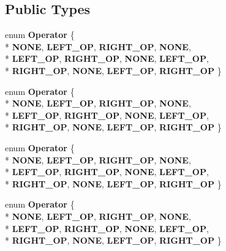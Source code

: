 \subsection*{Public Types}
\begin{DoxyCompactItemize}
\item 
enum {\bfseries Operator} \{ \\*
{\bfseries N\-O\-N\-E}, 
{\bfseries L\-E\-F\-T\-\_\-\-O\-P}, 
{\bfseries R\-I\-G\-H\-T\-\_\-\-O\-P}, 
{\bfseries N\-O\-N\-E}, 
\\*
{\bfseries L\-E\-F\-T\-\_\-\-O\-P}, 
{\bfseries R\-I\-G\-H\-T\-\_\-\-O\-P}, 
{\bfseries N\-O\-N\-E}, 
{\bfseries L\-E\-F\-T\-\_\-\-O\-P}, 
\\*
{\bfseries R\-I\-G\-H\-T\-\_\-\-O\-P}, 
{\bfseries N\-O\-N\-E}, 
{\bfseries L\-E\-F\-T\-\_\-\-O\-P}, 
{\bfseries R\-I\-G\-H\-T\-\_\-\-O\-P}
 \}
\item 
enum {\bfseries Operator} \{ \\*
{\bfseries N\-O\-N\-E}, 
{\bfseries L\-E\-F\-T\-\_\-\-O\-P}, 
{\bfseries R\-I\-G\-H\-T\-\_\-\-O\-P}, 
{\bfseries N\-O\-N\-E}, 
\\*
{\bfseries L\-E\-F\-T\-\_\-\-O\-P}, 
{\bfseries R\-I\-G\-H\-T\-\_\-\-O\-P}, 
{\bfseries N\-O\-N\-E}, 
{\bfseries L\-E\-F\-T\-\_\-\-O\-P}, 
\\*
{\bfseries R\-I\-G\-H\-T\-\_\-\-O\-P}, 
{\bfseries N\-O\-N\-E}, 
{\bfseries L\-E\-F\-T\-\_\-\-O\-P}, 
{\bfseries R\-I\-G\-H\-T\-\_\-\-O\-P}
 \}
\item 
enum {\bfseries Operator} \{ \\*
{\bfseries N\-O\-N\-E}, 
{\bfseries L\-E\-F\-T\-\_\-\-O\-P}, 
{\bfseries R\-I\-G\-H\-T\-\_\-\-O\-P}, 
{\bfseries N\-O\-N\-E}, 
\\*
{\bfseries L\-E\-F\-T\-\_\-\-O\-P}, 
{\bfseries R\-I\-G\-H\-T\-\_\-\-O\-P}, 
{\bfseries N\-O\-N\-E}, 
{\bfseries L\-E\-F\-T\-\_\-\-O\-P}, 
\\*
{\bfseries R\-I\-G\-H\-T\-\_\-\-O\-P}, 
{\bfseries N\-O\-N\-E}, 
{\bfseries L\-E\-F\-T\-\_\-\-O\-P}, 
{\bfseries R\-I\-G\-H\-T\-\_\-\-O\-P}
 \}
\item 
enum {\bfseries Operator} \{ \\*
{\bfseries N\-O\-N\-E}, 
{\bfseries L\-E\-F\-T\-\_\-\-O\-P}, 
{\bfseries R\-I\-G\-H\-T\-\_\-\-O\-P}, 
{\bfseries N\-O\-N\-E}, 
\\*
{\bfseries L\-E\-F\-T\-\_\-\-O\-P}, 
{\bfseries R\-I\-G\-H\-T\-\_\-\-O\-P}, 
{\bfseries N\-O\-N\-E}, 
{\bfseries L\-E\-F\-T\-\_\-\-O\-P}, 
\\*
{\bfseries R\-I\-G\-H\-T\-\_\-\-O\-P}, 
{\bfseries N\-O\-N\-E}, 
{\bfseries L\-E\-F\-T\-\_\-\-O\-P}, 
{\bfseries R\-I\-G\-H\-T\-\_\-\-O\-P}
 \}
\end{DoxyCompactItemize}
